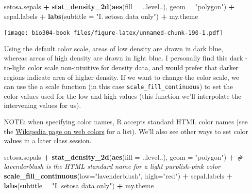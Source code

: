 \documentclass[]{book}
\newenvironment{Shaded}{\begin{snugshade}}{\end{snugshade}}
\newcommand{\CommentTok}[1]{\textcolor[rgb]{0.56,0.35,0.01}{\textit{#1}}}
\newcommand{\DataTypeTok}[1]{\textcolor[rgb]{0.13,0.29,0.53}{#1}}
\newcommand{\KeywordTok}[1]{\textcolor[rgb]{0.13,0.29,0.53}{\textbf{#1}}}
\newcommand{\NormalTok}[1]{#1}
\newcommand{\OperatorTok}[1]{\textcolor[rgb]{0.81,0.36,0.00}{\textbf{#1}}}
\newcommand{\StringTok}[1]{\textcolor[rgb]{0.31,0.60,0.02}{#1}}
\theoremstyle{definition}
\theoremstyle{definition}
\theoremstyle{definition}
\theoremstyle{remark}
\begin{document}
\begin{Shaded}
\begin{Highlighting}[]
\NormalTok{setosa.sepals }\OperatorTok{+}\StringTok{ }
\StringTok{  }\KeywordTok{stat_density_2d}\NormalTok{(}\KeywordTok{aes}\NormalTok{(}\DataTypeTok{fill =}\NormalTok{ ..level..), }\DataTypeTok{geom =} \StringTok{"polygon"}\NormalTok{) }\OperatorTok{+}\StringTok{ }
\StringTok{  }\NormalTok{sepal.labels }\OperatorTok{+}\StringTok{ }\KeywordTok{labs}\NormalTok{(}\DataTypeTok{subtitle =} \StringTok{"I. setosa data only"}\NormalTok{) }\OperatorTok{+}
\StringTok{  }\NormalTok{my.theme}
\end{Highlighting}
\end{Shaded}

\texttt{[image: bio304-book\_files/figure-latex/unnamed-chunk-190-1.pdf]}

Using the default color scale, areas of low density are drawn in dark
blue, whereas areas of high density are drawn in light blue. I
personally find this dark -to-light color scale non-intuitive for
density data, and would prefer that darker regions indicate area of
higher density. If we want to change the color scale, we can use the a
scale function (in this case \texttt{scale\_fill\_continuous}) to set
the color values used for the low and high values (this function we'll
interpolate the intervening values for us).

NOTE: when specifying color names, R accepts standard HTML color names
(see the \href{https://en.wikipedia.org/wiki/Web_colors}{Wikipedia page
on web colors} for a list). We'll also see other ways to set color
values in a later class session.

\begin{Shaded}
\begin{Highlighting}[]
\NormalTok{setosa.sepals }\OperatorTok{+}\StringTok{ }
\StringTok{  }\KeywordTok{stat_density_2d}\NormalTok{(}\KeywordTok{aes}\NormalTok{(}\DataTypeTok{fill =}\NormalTok{ ..level..), }\DataTypeTok{geom =} \StringTok{"polygon"}\NormalTok{) }\OperatorTok{+}\StringTok{ }
\StringTok{  }\CommentTok{# lavenderblush is the HTML standard name for a light purplish-pink color}
\StringTok{  }\KeywordTok{scale_fill_continuous}\NormalTok{(}\DataTypeTok{low=}\StringTok{"lavenderblush"}\NormalTok{, }\DataTypeTok{high=}\StringTok{"red"}\NormalTok{) }\OperatorTok{+}
\StringTok{  }\NormalTok{sepal.labels }\OperatorTok{+}\StringTok{ }\KeywordTok{labs}\NormalTok{(}\DataTypeTok{subtitle =} \StringTok{"I. setosa data only"}\NormalTok{) }\OperatorTok{+}
\StringTok{  }\NormalTok{my.theme}
\end{Highlighting}
\end{Shaded}
\end{document}
